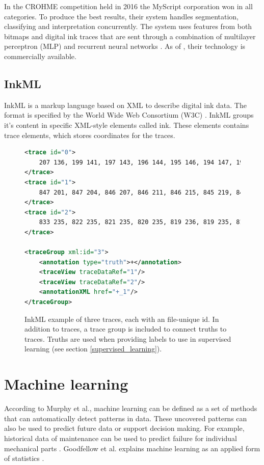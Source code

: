 In the CROHME competition held in 2016 the MyScript corporation won in all categories. To produce the best results, their system handles segmentation, classifying and interpretation concurrently. The system uses features from both bitmaps and digital ink traces that are sent through a combination of multilayer perceptron (MLP) and recurrent neural networks \cite{mouchere_icfhr2016_2016}. As of \mydate, their technology is commercially available.

\subsection{InkML}
InkML is a markup language based on XML to describe digital ink data. The format is specified by the World Wide Web Consortium (W3C) \cite{chee_ink_2011}. InkML groups it's content in specific XML-style elements called ink. These elements contains trace elements, which stores coordinates for the traces. 

\begin{figure}[H]
\begin{lstlisting}[language=XML]
<trace id="0">
    207 136, 199 141, 197 143, 196 144, 195 146, 194 147, 193 149
</trace>
<trace id="1">
    847 201, 847 204, 846 207, 846 211, 846 215, 845 219, 845 222
</trace>
<trace id="2">
    833 235, 822 235, 821 235, 820 235, 819 236, 819 235, 819 236
</trace>

<traceGroup xml:id="3">
	<annotation type="truth">+</annotation>
	<traceView traceDataRef="1"/>
	<traceView traceDataRef="2"/>
	<annotationXML href="+_1"/>
</traceGroup>
\end{lstlisting}

\caption{InkML example of three traces, each with an file-unique id. In addition to traces, a trace group is included to connect truths to traces. Truths are used when providing labels to use in supervised learning (see section \ref{supervised_learning}).}

\label{fig:InkML_ex}
\end{figure}

\section{Machine learning}
\label{machine_learning}
According to Murphy et al.\cite{murphy_machine_2012}, machine learning can be defined as a set of methods that can automatically detect patterns in data. These uncovered patterns can also be used to predict future data or support decision making. For example, historical data of maintenance can be used to predict failure for individual mechanical parts \cite{cline_predictive_2017}. Goodfellow et al. explains machine learning as an applied form of statistics \cite{goodfellow_deep_2016}.

